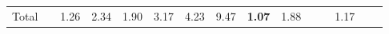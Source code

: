 \begin{tabular}{ll|rrrrrr|rrrrrrr}
  \hline
  Total  & &



  


  
  1.26 & 2.34 & 1.90 & 3.17 & 4.23 & 9.47 & \textbf{1.07} & 1.88 &  &  & 1.17 \\


\end{tabular}
